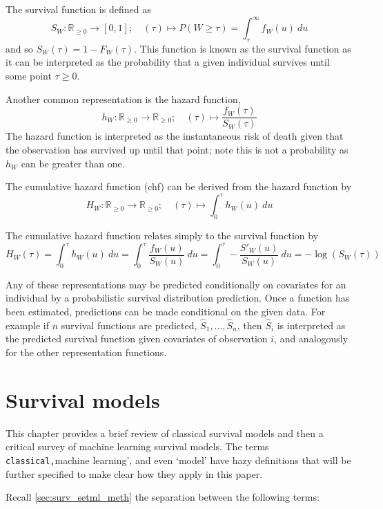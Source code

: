 \documentclass[
  letterpaper,
]{scrbook}
\theoremstyle{plain}
\theoremstyle{definition}
\theoremstyle{remark}
\begin{document}
The survival function is defined as \[
S_W: \mathbb{R}_{\geq 0}\rightarrow [0,1]; \quad
(\tau) \mapsto P(W \geq \tau) = \int^\infty_\tau f_W(u) \ du
\] and so \(S_W(\tau) = 1-F_W(\tau)\). This function is known as the
survival function as it can be interpreted as the probability that a
given individual survives until some point \(\tau \geq 0\).

Another common representation is the hazard function, \[
h_W: \mathbb{R}_{\geq 0}\rightarrow \mathbb{R}_{\geq 0}; \quad
(\tau) \mapsto  \frac{f_W(\tau)}{S_W(\tau)}
\] The hazard function is interpreted as the instantaneous risk of death
given that the observation has survived up until that point; note this
is not a probability as \(h_W\) can be greater than one.

The cumulative hazard function (chf) can be derived from the hazard
function by \[
H_W: \mathbb{R}_{\geq 0}\rightarrow \mathbb{R}_{\geq 0}; \quad
(\tau) \mapsto \int^\tau_0 h_W(u) \ du
\]

The cumulative hazard function relates simply to the survival function
by \[
H_W(\tau) = \int^\tau_0 h_W(u) \ du = \int^\tau_0 \frac{f_W(u)}{S_W(u)} \ du = \int^\tau_0 -\frac{S'_W(u)}{S_W(u)} \ du = -\log(S_W(\tau))
\]

Any of these representations may be predicted conditionally on
covariates for an individual by a probabilistic survival distribution
prediction. Once a function has been estimated, predictions can be made
conditional on the given data. For example if \(n\) survival functions
are predicted, \(\hat{S}_1,...,\hat{S}_n\), then \(\hat{S}_i\) is
interpreted as the predicted survival function given covariates of
observation \(i\), and analogously for the other representation
functions.


\hypertarget{survival-models}{%
\chapter{Survival models}\label{survival-models}}

This chapter provides a brief review of classical survival models and
then a critical survey of machine learning survival models. The terms
\texttt{classical\textquotesingle{},}machine learning', and even `model'
have hazy definitions that will be further specified to make clear how
they apply in this paper.

Recall \ref{sec:surv_setml_meth} the separation between the following
terms:
\end{document}
